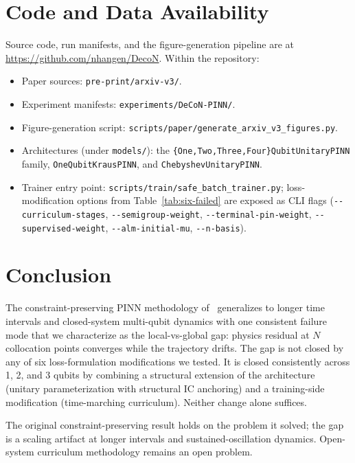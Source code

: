 \documentclass[11pt]{article}
\begin{document}
\section{Code and Data Availability}
\label{sec:availability}

\begin{sloppypar}
Source code, run manifests, and the figure-generation pipeline are at
\url{https://github.com/nhangen/DecoN}. Within the repository:
\begin{itemize}
\item Paper sources: \texttt{pre-print/arxiv-v3/}.
\item Experiment manifests: \texttt{experiments/DeCoN-PINN/}.
\item Figure-generation script:
  \texttt{scripts/paper/generate\_arxiv\_v3\_figures.py}.
\item Architectures (under \texttt{models/}): the
  \texttt{\{One,Two,Three,Four\}QubitUnitaryPINN} family,
  \texttt{OneQubitKrausPINN}, and \texttt{ChebyshevUnitaryPINN}.
\item Trainer entry point: \texttt{scripts/train/safe\_batch\_trainer.py};
  loss-modification options from Table~\ref{tab:six-failed} are exposed as
  CLI flags
  (\texttt{-{}-curriculum-stages},
  \texttt{-{}-semigroup-weight},
  \texttt{-{}-terminal-pin-weight},
  \texttt{-{}-supervised-weight},
  \texttt{-{}-alm-initial-mu},
  \texttt{-{}-n-basis}).
\end{itemize}
\end{sloppypar}

\section{Conclusion}

The constraint-preserving PINN methodology of~\cite{hangen2024constraint} generalizes to longer time intervals and closed-system multi-qubit dynamics with one consistent failure mode that we characterize as the local-vs-global gap: physics residual at $N$ collocation points converges while the trajectory drifts. The gap is not closed by any of six loss-formulation modifications we tested. It is closed consistently across 1, 2, and 3 qubits by combining a structural extension of the architecture (unitary parameterization with structural IC anchoring) and a training-side modification (time-marching curriculum). Neither change alone suffices.

The original constraint-preserving result holds on the problem it solved; the gap is a scaling artifact at longer intervals and sustained-oscillation dynamics. Open-system curriculum methodology remains an open problem.



\end{document}
